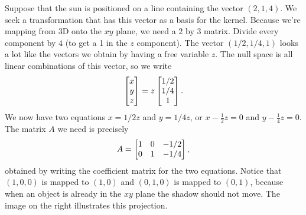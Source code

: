 \begin{example}
Suppose that the sun is positioned on a line containing the vector $(2,1,4)$.  
We seek a transformation that has this vector as a basis for the kernel.  
Because we're mapping from 3D onto the $xy$ plane, we need a $2$ by $3$ matrix. 
Divide every component by $4$ (to get a 1 in the $z$ component). The vector $(1/2,1/4,1)$ looks a lot like the vectors we obtain by having a free variable $z$.  The null space is all linear combinations of this vector, so we write $$\begin{bmatrix} x\\y\\z \end{bmatrix} = z\begin{bmatrix} 1/2\\1/4\\1 \end{bmatrix}. $$ We now have two equations $x=1/2 z$ and $y=1/4z$, or $x-\frac12 z=0$ and $y-\frac14 z=0$.  The matrix $A$ we need is precisely $$A=\begin{bmatrix} 1&0&-1/2\\0&1&-1/4 \end{bmatrix},$$ obtained by writing the coefficient matrix for the two equations. 
Notice that $(1,0,0)$ is mapped to $(1,0)$ and $(0,1,0)$ is mapped to $(0,1)$, because when an object is already in the $xy$ plane the shadow should not move. 
The image on the right illustrates this projection. 
\end{example}


